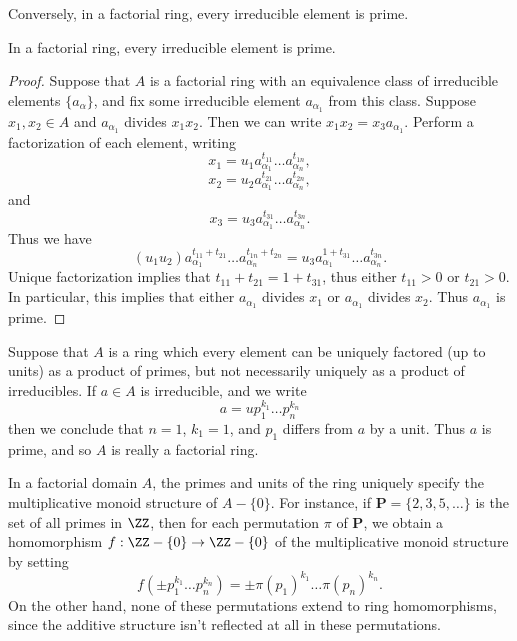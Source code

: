 Conversely, in a factorial ring, every irreducible element is prime.

\begin{theorem}
    In a factorial ring, every irreducible element is prime.
\end{theorem}
\begin{proof}
    Suppose that $A$ is a factorial ring with an equivalence class of irreducible elements $\{ a_\alpha \}$, and fix some irreducible element $a_{\alpha_1}$ from this class. Suppose $x_1,x_2 \in A$ and $a_{\alpha_1}$ divides $x_1x_2$. Then we can write $x_1x_2 = x_3a_{\alpha_1}$. Perform a factorization of each element, writing
    \[ x_1 = u_1 a_{\alpha_1}^{t_{11}} \dots a_{\alpha_n}^{t_{1n}}, \]
    \[ x_2 = u_2 a_{\alpha_1}^{t_{21}} \dots a_{\alpha_n}^{t_{2n}}, \]
    and
    \[ x_3 = u_3 a_{\alpha_1}^{t_{31}} \dots a_{\alpha_n}^{t_{3n}}. \]
    Thus we have
    \[ (u_1u_2) a_{\alpha_1}^{t_{11} + t_{21}} \dots a_{\alpha_n}^{t_{1n} + t_{2n}} = u_3 a_{\alpha_1}^{1 + t_{31}} \dots a_{\alpha_n}^{t_{3n}}. \]
    Unique factorization implies that $t_{11} + t_{21} = 1 + t_{31}$, thus either $t_{11} > 0$ or $t_{21} > 0$. In particular, this implies that either $a_{\alpha_1}$ divides $x_1$ or $a_{\alpha_1}$ divides $x_2$. Thus $a_{\alpha_1}$ is prime.
\end{proof}

\begin{remark}
    Suppose that $A$ is a ring which every element can be uniquely factored (up to units) as a product of primes, but not necessarily uniquely as a product of irreducibles. If $a \in A$ is irreducible, and we write
    \[ a = u p_1^{k_1} \dots p_n^{k_n} \]
    then we conclude that $n = 1$, $k_1 = 1$, and $p_1$ differs from $a$ by a unit. Thus $a$ is prime, and so $A$ is really a factorial ring.
\end{remark}

In a factorial domain $A$, the primes and units of the ring uniquely specify the multiplicative monoid structure of $A - \{ 0 \}$. For instance, if $\mathbf{P} = \{ 2, 3, 5, \dots \}$ is the set of all primes in $\ZZ$, then for each permutation $\pi$ of $\mathbf{P}$, we obtain a homomorphism $f: \ZZ - \{ 0 \} \to \ZZ - \{ 0 \}$ of the multiplicative monoid structure by setting
%
\[ f(\pm p_1^{k_1} \dots p_n^{k_n}) = \pm \pi(p_1)^{k_1} \dots \pi(p_n)^{k_n}. \]
%
On the other hand, none of these permutations extend to ring homomorphisms, since the additive structure isn't reflected at all in these permutations.








